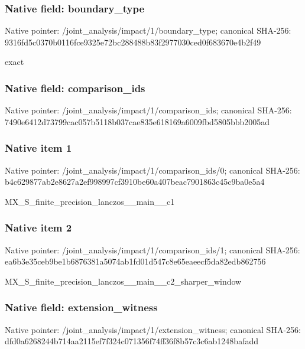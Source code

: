 \documentclass[10pt,a4paper]{article}
\begin{document}
\subsubsection{Native field: boundary\_\allowbreak{}type}
Native pointer: /joint\_\allowbreak{}analysis/impact/1/boundary\_\allowbreak{}type; canonical SHA-256: 9316fd5c0370b0116fce9325e72bc288488b83f2977030ced0f683670e4b2f49

\begingroup\raggedright\sloppy exact\par\endgroup

\subsubsection{Native field: comparison\_\allowbreak{}ids}
Native pointer: /joint\_\allowbreak{}analysis/impact/1/comparison\_\allowbreak{}ids; canonical SHA-256: 7490e6412d73799cac057b5118b037cae835e618169a6009fbd5805bbb2005ad

\subsubsection{Native item 1}
Native pointer: /joint\_\allowbreak{}analysis/impact/1/comparison\_\allowbreak{}ids/0; canonical SHA-256: b4c629877ab2e8627a2ef998997cf3910be60a407beac7901863c45c9ba0e5a4

\begingroup\raggedright\sloppy MX\_\allowbreak{}S\_\allowbreak{}finite\_\allowbreak{}precision\_\allowbreak{}lanczos\_\allowbreak{}\_\allowbreak{}main\_\allowbreak{}\_\allowbreak{}c1\par\endgroup

\subsubsection{Native item 2}
Native pointer: /joint\_\allowbreak{}analysis/impact/1/comparison\_\allowbreak{}ids/1; canonical SHA-256: ea6b3e35ceb9be1b6876381a5074ab1fd01d547c8e65eaeecf5da82edb862756

\begingroup\raggedright\sloppy MX\_\allowbreak{}S\_\allowbreak{}finite\_\allowbreak{}precision\_\allowbreak{}lanczos\_\allowbreak{}\_\allowbreak{}main\_\allowbreak{}\_\allowbreak{}c2\_\allowbreak{}sharper\_\allowbreak{}window\par\endgroup

\subsubsection{Native field: extension\_\allowbreak{}witness}
Native pointer: /joint\_\allowbreak{}analysis/impact/1/extension\_\allowbreak{}witness; canonical SHA-256: dfd0a6268244b714aa2115ef7f324c071356f74ff36f8b57c3c6ab1248bafadd
\end{document}
